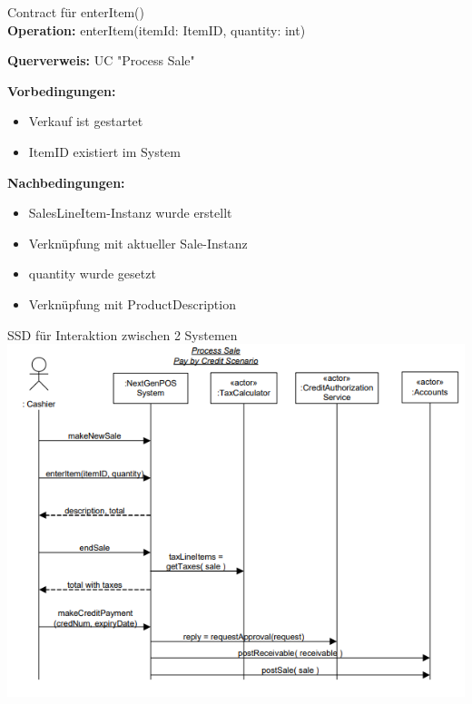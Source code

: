 \begin{example2}{Contract für enterItem()}\\
\textbf{Operation:} enterItem(itemId: ItemID, quantity: int)

\textbf{Querverweis:} UC "Process Sale"

\textbf{Vorbedingungen:}
\begin{itemize}
    \item Verkauf ist gestartet
    \item ItemID existiert im System
\end{itemize}

\textbf{Nachbedingungen:}
\begin{itemize}
    \item SalesLineItem-Instanz wurde erstellt
    \item Verknüpfung mit aktueller Sale-Instanz
    \item quantity wurde gesetzt
    \item Verknüpfung mit ProductDescription
\end{itemize}
\end{example2}

\begin{example2}{SSD für Interaktion zwischen 2 Systemen}\\
    \includegraphics[width=\linewidth]{ssdzweisysteme.png}
\end{example2}



